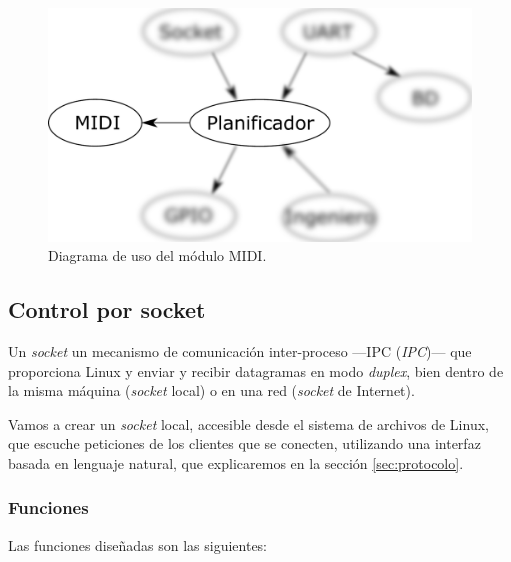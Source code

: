 \smallskip

\begin{figure}[H]
	\noindent \begin{centering}
		\includegraphics[width=\linewidth/2]{capitulo4/daemon_midi}
		\par\end{centering}
	\smallskip
	\caption{\label{fig:daemon_midi} Diagrama de uso del módulo MIDI.}
\end{figure} 

\smallskip

\subsection{Control por socket}
\label{subsec:daemon}

Un \textit{socket} un mecanismo de comunicación inter-proceso ---\acrshort{IPC} (\textit{\acrlong{IPC}})--- que proporciona Linux y enviar y recibir datagramas en modo \textit{duplex}, bien dentro de la misma máquina (\textit{socket} local) o en una red (\textit{socket} de Internet).

Vamos a crear un \textit{socket} local, accesible desde el sistema de archivos de Linux, que escuche peticiones de los clientes que se conecten, utilizando una interfaz basada en lenguaje natural, que explicaremos en la sección \ref{sec:protocolo}.

\subsubsection{Funciones}

Las funciones diseñadas son las siguientes:

